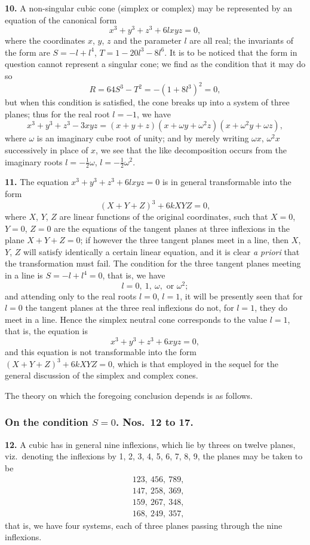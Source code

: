 \documentclass[11pt,a4paper]{article}
\theoremstyle{plain}
\begin{document}
\noindent\textbf{10.} A non-singular cubic cone (simplex or complex) may be represented by an equation of the canonical form
\[
x^3 + y^3 + z^3 + 6lxyz = 0,
\]
where the coordinates $x$, $y$, $z$ and the parameter $l$ are all real; the invariants of the form are $S = -l + l^4$, $T = 1 - 20l^3 - 8l^6$. It is to be noticed that the form in question cannot represent a singular cone; we find as the condition that it may do so
\[
R = 64S^3 - T^2 = -(1+8l^3)^2 = 0,
\]
but when this condition is satisfied, the cone breaks up into a system of three planes; thus for the real root $l = -1$, we have
\[
x^3+y^3+z^3-3xyz = (x+y+z)(x+\omega y+\omega^2z)(x+\omega^2y+\omega z),
\]
where $\omega$ is an imaginary cube root of unity; and by merely writing $\omega x$, $\omega^2x$ successively in place of $x$, we see that the like decomposition occurs from the imaginary roots $l = -\tfrac{1}{2}\omega$, $l = -\tfrac{1}{2}\omega^2$.

\noindent\textbf{11.} The equation $x^3 + y^3 + z^3 + 6lxyz = 0$ is in general transformable into the form
\[
(X+Y+Z)^3 + 6kXYZ = 0,
\]
where $X$, $Y$, $Z$ are linear functions of the original coordinates, such that $X=0$, $Y=0$, $Z=0$ are the equations of the tangent planes at three inflexions in the plane $X+Y+Z=0$; if however the three tangent planes meet in a line, then $X$, $Y$, $Z$ will satisfy identically a certain linear equation, and it is clear \textit{a priori} that the transformation must fail. The condition for the three tangent planes meeting in a line is $S = -l + l^4 = 0$, that is, we have
\[
l = 0, \ 1, \ \omega, \text{ or } \omega^2;
\]
and attending only to the real roots $l=0$, $l=1$, it will be presently seen that for $l=0$ the tangent planes at the three real inflexions do not, for $l=1$, they do meet in a line. Hence the simplex neutral cone corresponds to the value $l=1$, that is, the equation is
\[
x^3 + y^3 + z^3 + 6xyz = 0,
\]
and this equation is not transformable into the form $(X+Y+Z)^3 + 6kXYZ = 0$, which is that employed in the sequel for the general discussion of the simplex and complex cones.

The theory on which the foregoing conclusion depends is as follows.

\subsubsection*{On the condition $S=0$. Nos.\ 12 to 17.}

\noindent\textbf{12.} A cubic has in general nine inflexions, which lie by threes on twelve planes, viz.\ denoting the inflexions by 1, 2, 3, 4, 5, 6, 7, 8, 9, the planes may be taken to be
\begin{align*}
&123, \ 456, \ 789,\\
&147, \ 258, \ 369,\\
&159, \ 267, \ 348,\\
&168, \ 249, \ 357,
\end{align*}
that is, we have four systems, each of three planes passing through the nine inflexions.
\end{document}
